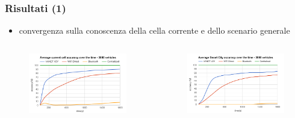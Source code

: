 \documentclass{beamer}
\begin{document}
\begin{frame}
  \frametitle{Risultati (1)}
  \begin{itemize}
    \item convergenza sulla conoscenza della cella corrente e dello scenario generale
  \end{itemize}
  \begin{columns}
    \begin{column}{0.45\textwidth}
      \begin{figure}
	\includegraphics[width=\columnwidth]{img/graphics/local_accuracy.png}
      \end{figure}
      
    \end{column}
    \begin{column}{0.45\textwidth}
      \begin{figure}
	\includegraphics[width=\columnwidth]{img/graphics/global_accuracy.png}
      \end{figure}
    \end{column}
  \end{columns}
\end{frame}
\end{document}
